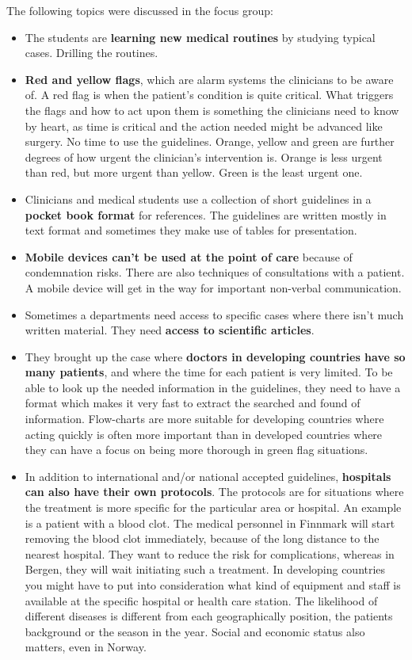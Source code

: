 The following topics were discussed in the focus group:
\begin{itemize}
	\item The students are \textbf{learning new medical routines} by studying typical cases. Drilling the routines.
	\item \textbf{Red and yellow flags}, which are alarm systems the clinicians to be aware of. A red flag is when the patient's condition is quite critical. What triggers the flags and how to act upon them is something the clinicians need to know by heart, as time is critical and the action needed might be advanced like surgery. No time to use the guidelines. Orange, yellow and green are further degrees of how urgent the clinician's intervention is.  Orange is less urgent than red, but more urgent than yellow. Green is the least urgent one.
	\item Clinicians and medical students use a collection of short guidelines in a \textbf{pocket book format} for references. The guidelines are written mostly in text format and sometimes they make use of tables for presentation.
	\item \textbf{Mobile devices can't be used at the point of care} because of condemnation risks. There are also techniques of consultations with a patient. A mobile device will get in the way for important non-verbal communication.
	\item Sometimes a departments need access to specific cases where there isn't much written material. They need \textbf{access to scientific articles}.
	\item They brought up the case where \textbf{doctors in developing countries have so many patients}, and where the time for each patient is very limited. To be able to look up the needed information in the guidelines, they need to have a format which makes it very fast to extract the searched and found of information. Flow-charts are more suitable for developing countries where acting quickly is often more important than in developed countries where they can have a focus on being more thorough in green flag situations.
	\item In addition to international and/or national accepted guidelines, \textbf{hospitals can also have their own protocols}. The protocols are for situations where the treatment is more specific for the particular area or hospital. An example is a patient with a blood clot. The medical personnel in Finnmark will start removing the blood clot immediately, because of the long distance to the nearest hospital. They want to reduce the risk for complications, whereas in Bergen, they will wait initiating such a treatment. In developing countries you might have to put into consideration what kind of equipment and staff is available at the specific hospital or health care station. The likelihood of different diseases is different from each geographically position, the patients background or the season in the year. Social and economic status also matters, even in Norway.

\end{itemize}
